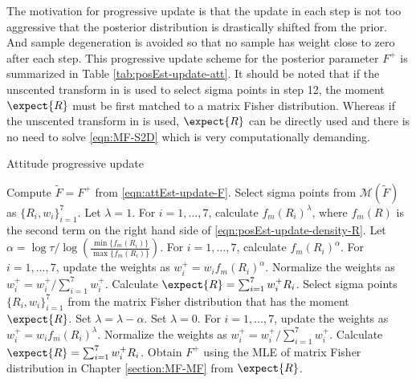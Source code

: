 The motivation for progressive update is that the update in each step is not too aggressive that the posterior distribution is drastically shifted from the prior.
And sample degeneration is avoided so that no sample has weight close to zero after each step.
This progressive update scheme for the posterior parameter $F^+$ is summarized in Table \ref{tab:posEst-update-att}.
It should be noted that if the unscented transform in \cite{lee2018bayesian} is used to select sigma points in step 12, the moment $\expect{R}$ must be first matched to a matrix Fisher distribution.
Whereas if the unscented transform in \cite{gilitschenski2015unscented} is used, $\expect{R}$ can be directly used and there is no need to solve \eqref{eqn:MF-S2D} which is very computationally demanding.

\begin{table}
	\caption{Attitude progressive update}
	\label{tab:posEst-update-att}
	\begin{algorithmic}[1]
		\algrule[0.8pt]
		\algrule
		\State Compute $\tilde{F} = F^+$ from \eqref{eqn:attEst-update-F}.
		\State Select sigma points \cite{gilitschenski2015unscented,lee2018bayesian} from $\mathcal{M}(\tilde{F})$ as $\{R_i,w_i\}_{i=1}^7$.
		\State Let $\lambda = 1$.
		\State For $i=1,\ldots,7$, calculate $f_m(R_i)^\lambda$, where $f_m(R)$ is the second term on the right hand side of \eqref{eqn:posEst-update-density-R}.
		\State Let $\alpha = \log\tau / \log\left( \tfrac{\min\{f_m(R_i)\}}{\max\{f_m(R_i)\}} \right)$.
		\State For $i=1,\ldots,7$, calculate $f_m(R_i)^\alpha$.
		\State For $i=1,\ldots,7$, update the weights as $w_i^+ = w_i f_m(R_i)^\alpha$.
		\State Normalize the weights as $w_i^+ = w_i^+/\sum_{i=1}^7 w_i^+$.
		\State Calculate $\expect{R} = \sum_{i=1}^7 w_i^+ R_i$.
		\State Select sigma points $\{R_i,w_i\}_{i=1}^7$ from the matrix Fisher distribution that has the moment $\expect{R}$.
		\State Set $\lambda = \lambda-\alpha$.
		\Else
		\State Set $\lambda = 0$.
		\EndIf
		\EndWhile
		\State For $i=1,\ldots,7$, update the weights as $w_i^+ = w_i f_m(R_i)^\lambda$.
		\State Normalize the weights as $w_i^+ = w_i^+/\sum_{i=1}^7 w_i^+$.
		\State Calculate $\expect{R} = \sum_{i=1}^7 w_i^+ R_i$.
		\State Obtain $F^+$ using the MLE of matrix Fisher distribution in Chapter \ref{section:MF-MF} from $\expect{R}$.
		\EndProcedure
		\algrule[0.8pt]
	\end{algorithmic}
\end{table}

